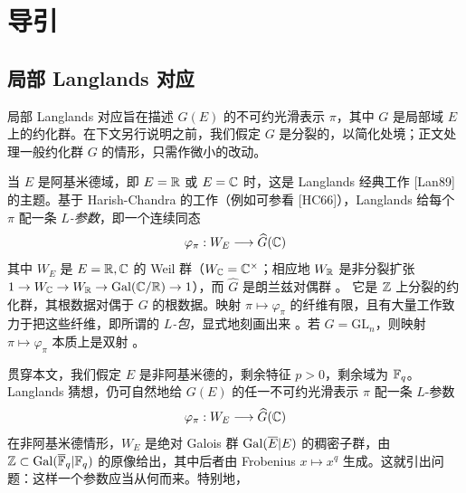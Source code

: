 
\chapter{导引}%

\section{局部 Langlands 对应}%

\leavevmode{}局部 Langlands 对应旨在描述 $G(E)$ 的不可约光滑表示 $\pi$，其中 $G$ 是局部域 $E$ 上的约化群。在下文另行说明之前，我们假定 $G$ 是分裂的，以简化处境；正文处理一般约化群 $G$ 的情形，只需作微小的改动。

当 $E$ 是阿基米德域，即 $E=\mathbb{R}$ 或 $E=\mathbb{C}$ 时，这是 Langlands 经典工作 [Lan89] 的主题。基于 Harish-Chandra 的工作（例如可参看 [HC66]），Langlands 给每个 $\pi$ 配一条 \emph{$L$-参数}，即一个连续同态
\[
  \varphi_\pi : W_E \longrightarrow \widehat{G}(\mathbb{C})
\]
其中 $W_E$ 是 $E=\mathbb{R},\mathbb{C}$ 的 Weil 群（$W_{\mathbb{C}}=\mathbb{C}^\times$；相应地 $W_{\mathbb{R}}$ 是非分裂扩张 $1\to W_{\mathbb{C}}\to W_{\mathbb{R}}\to\operatorname{Gal}(\mathbb{C}/\mathbb{R})\to 1$），而 $\widehat{G}$ 是朗兰兹对偶群%
。
它是 $\mathbb{Z}$ 上分裂的约化群，其根数据对偶于 $G$ 的根数据。映射 $\pi\mapsto\varphi_\pi$ 的纤维有限，且有大量工作致力于把这些纤维，即所谓的 \emph{$L$-包}，显式地刻画出来
。若 $G=\mathrm{GL}_n$，则映射 $\pi\mapsto\varphi_\pi$ 本质上是双射%
。

贯穿本文，我们假定 $E$ 是非阿基米德的，剩余特征 $p>0$，剩余域为 $\mathbb{F}_q$。Langlands 猜想，仍可自然地给 $G(E)$ 的任一不可约光滑表示 $\pi$ 配一条 $L$-参数
\[
  \varphi_\pi : W_E \longrightarrow \widehat{G}(\mathbb{C})
\]
在非阿基米德情形，$W_E$ 是绝对 Galois 群 $\operatorname{Gal}(\overline{E}|E)$ 的稠密子群，由 $\mathbb{Z}\subset\operatorname{Gal}(\overline{\mathbb{F}}_q|\mathbb{F}_q)$ 的原像给出，其中后者由 Frobenius $x\mapsto x^q$ 生成。这就引出问题：这样一个参数应当从何而来。特别地，

